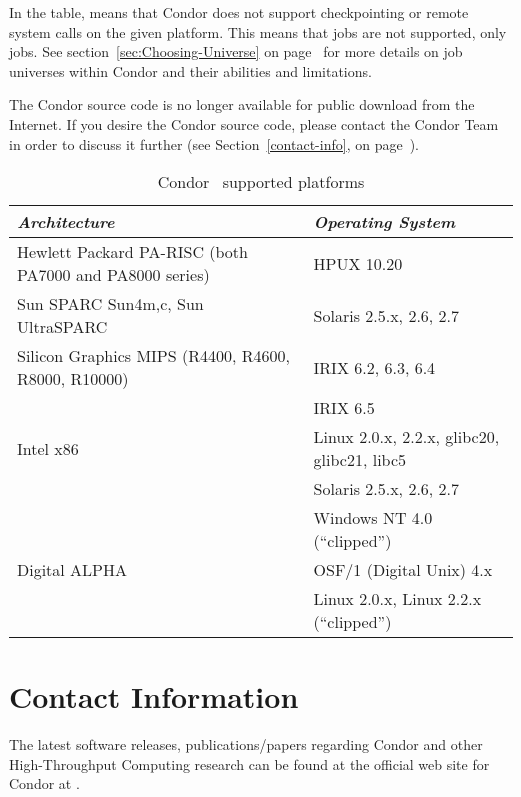 In the table,  means that Condor does not support
checkpointing or remote system calls on the given platform. 
This means that  jobs are not supported, only
 jobs.
See section~\ref{sec:Choosing-Universe} on
page~\pageref{sec:Choosing-Universe} for more details on job universes
within Condor and their abilities and limitations.

The Condor source code is no longer available for public download from the Internet.  If you 
desire the Condor source code, please contact the Condor Team in order to discuss it further 
(see Section~\ref{contact-info}, on page~\pageref{contact-info}).

\begin{center}
\begin{table}[hbt]
\begin{tabular}{|ll|} \hline
\emph{Architecture} & \emph{Operating System} \\ \hline \hline
Hewlett Packard PA-RISC (both PA7000 and PA8000 series) & HPUX 10.20 \\ \hline
Sun SPARC Sun4{m,c}, Sun UltraSPARC & Solaris 2.5.x, 2.6, 2.7 \\ \hline
Silicon Graphics MIPS (R4400, R4600, R8000, R10000) & IRIX 6.2, 6.3, 6.4 \\ 
 & IRIX 6.5 \\ \hline
Intel x86 & Linux 2.0.x, 2.2.x, glibc20, glibc21, libc5 \\
 & Solaris 2.5.x, 2.6, 2.7 \\ 
 & Windows NT 4.0 (``clipped'') \\ \hline
Digital ALPHA & OSF/1 (Digital Unix) 4.x \\
 & Linux 2.0.x, Linux 2.2.x (``clipped'') \\ \hline
\end{tabular}
\caption{\label{supported-platforms}Condor \VersionNotice\ supported platforms}
\end{table}
\end{center}



\section{\label{contact-info}Contact Information}

The latest software releases, publications/papers regarding Condor and other 
High-Throughput Computing
research can be found at the official web site for Condor at  
.

